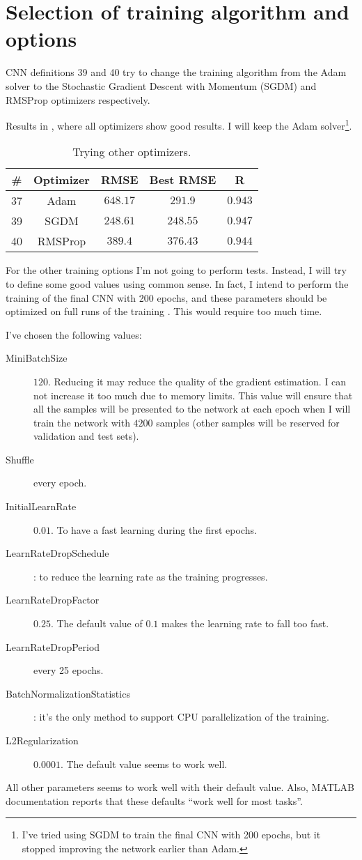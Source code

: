 \section{Selection of training algorithm and options}\label{sec:cnntraining}

CNN definitions 39 and 40 try to change the training algorithm from the Adam
solver to the Stochastic Gradient Descent with Momentum (SGDM) and RMSProp
optimizers respectively.

Results in , where all optimizers show good
results. I will keep the Adam solver\footnote{I've tried using SGDM to train
the final CNN with 200 epochs, but it stopped improving the network earlier
than Adam.}.

\begin{table}[hbtp]
	\centering
	\begin{tabular}{|c|c|c|c|c|}
		\toprule
		\# & Optimizer & RMSE & Best RMSE & R \\
		\midrule
		37 & Adam & \(648.17\) & \(291.9\) & \(0.943\) \\
		39 & SGDM & \(248.61\) & \(248.55\) & \(0.947\) \\
		40 & RMSProp & \(389.4\) & \(376.43\) & \(0.944\) \\
		\bottomrule
	\end{tabular}
	\caption{Trying other optimizers.}\label{table:cnntraining}
\end{table}

For the other training options  I'm not
going to perform tests. Instead, I will try to define some good values using
common sense. In fact, I intend to perform the training of the final CNN with
200 epochs, and these parameters should be optimized on full runs of the
training . This would require too much time.

I've chosen the following values:
\begin{description}
	\item[MiniBatchSize] \(120\). Reducing it may reduce the quality of the
		gradient estimation. I can not increase it too much due to
		memory limits. This value will ensure that all the samples will
		be presented to the network at each epoch when I will train the
		network with \(4200\) samples (other samples will be reserved
		for validation and test sets).
	\item[Shuffle] every epoch.
	\item[InitialLearnRate] \(0.01\). To have a fast learning during the
		first epochs.
	\item[LearnRateDropSchedule] : to reduce the learning
		rate as the training progresses.
	\item[LearnRateDropFactor] \(0.25\). The default value of \(0.1\) makes
		the learning rate to fall too fast.
	\item[LearnRateDropPeriod] every 25 epochs.
	\item[BatchNormalizationStatistics] : it's the only
		method to support CPU parallelization of the training.
	\item[L2Regularization] \(0.0001\). The default value seems to work
		well.
\end{description}

All other parameters seems to work well with their default value. Also, MATLAB
documentation reports that these defaults ``work well for most tasks''.

